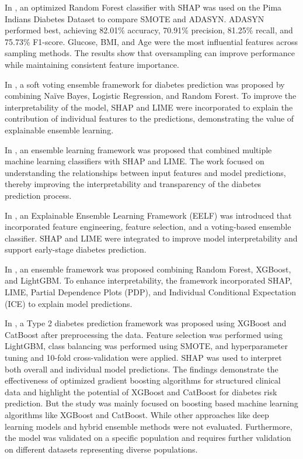 \documentclass[conference]{IEEEtran}
\begin{document}
In \cite{aulia2025}, an optimized Random Forest classifier with SHAP was used on the Pima Indians Diabetes Dataset to compare SMOTE and
ADASYN. ADASYN performed best, achieving 82.01\% accuracy, 70.91\% precision, 81.25\% recall, and 75.73\% F1-score. Glucose, BMI, and Age were the most influential features across sampling methods. The results show that oversampling can improve performance while maintaining consistent feature importance.

In \cite{Kibria2022}, a soft voting ensemble framework for diabetes prediction was proposed by combining Naïve Bayes, Logistic Regression, and Random Forest. To improve the interpretability of the model, SHAP and LIME were incorporated to explain the contribution of individual features to the predictions, demonstrating the value of explainable ensemble learning.

In \cite{Ganguly2023}, an ensemble learning framework was proposed that combined multiple machine learning classifiers with SHAP and LIME. The work focused on understanding the relationships between input features and model predictions, thereby improving the interpretability and transparency of the diabetes prediction process.

In \cite{Islam2025EarlyDiabetes}, an Explainable Ensemble Learning Framework (EELF) was introduced that incorporated feature engineering, feature selection, and a voting-based ensemble classifier. SHAP and LIME were integrated to improve model interpretability and support early-stage diabetes prediction.

In \cite{Islam2025Performance}, an ensemble framework was proposed combining Random Forest, XGBoost, and LightGBM. To enhance interpretability, the framework incorporated SHAP, LIME, Partial Dependence Plots (PDP), and Individual Conditional Expectation (ICE) to explain model predictions.

In \cite{rafie2025}, a Type 2 diabetes prediction framework was proposed using XGBoost and CatBoost after preprocessing the data. Feature selection was performed using LightGBM, class balancing was performed using SMOTE, and hyperparameter tuning and 10-fold cross-validation were applied. SHAP was used to interpret both overall and individual model predictions. The findings demonstrate the effectiveness of optimized gradient boosting algorithms for structured clinical data and highlight the potential of XGBoost and CatBoost for diabetes risk prediction. But the study was mainly focused on boosting based machine learning algorithms like XGBoost and CatBoost. While other approaches like deep learning models and hybrid ensemble methods were not evaluated. Furthermore, the model was validated on a specific population and requires further validation on different datasets representing diverse populations.
\end{document}
